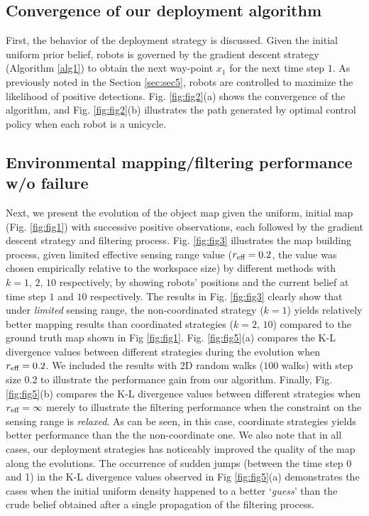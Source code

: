 \documentclass[letterpaper, 10 pt, conference]{ieeeconf}
\begin{document}
\subsection{Convergence of our deployment algorithm}
First, the behavior of the deployment strategy is discussed. Given the initial uniform prior belief, robots is governed by the gradient descent strategy (Algorithm \ref{alg1}) to obtain the next way-point $x_1$ for the next time step $1$. As previously noted in the Section \ref{sec:sec5}, robots are controlled to maximize the likelihood of positive detections.
Fig. \ref{fig:fig2}(a) shows the convergence of the algorithm, and Fig. \ref{fig:fig2}(b) illustrates the path generated by optimal control policy when each robot is a unicycle. 

\subsection{Environmental mapping/filtering performance w/o failure}
Next, we present the evolution of the object map given the uniform, initial map (Fig. \ref{fig:fig1}) with successive positive observations, each followed by the gradient descent strategy and filtering process. Fig. \ref{fig:fig3} illustrates the map building process, given limited effective sensing range value ($r_{\textup{eff}}=0.2$, the value was chosen empirically relative to the workspace size) 
by different methods with $k=1,\,2,\,10$ respectively, by showing robots' positions and the current belief at time step $1$ and $10$ respectively.
The results in Fig. \ref{fig:fig3} clearly show that under \emph{limited} sensing range, the non-coordinated strategy ($k=1$) yields relatively better mapping results than coordinated strategies ($k=2,\,10$) compared to the ground truth map shown in Fig \ref{fig:fig1}.
Fig. \ref{fig:fig5}(a) compares the K-L divergence values 
between different strategies during the evolution when $r_{\textup{eff}} =0.2$. We included the results with 2D random walks ($100$ walks) with step size $0.2$ to illustrate the performance gain from our algorithm.
Finally, Fig. \ref{fig:fig5}(b) compares the K-L divergence values between different strategies when $r_{\textup{eff}}=\infty$ merely to illustrate the filtering performance when the constraint on the sensing range is \emph{relaxed}. As can be seen, in this case, coordinate strategies yields better performance than the the non-coordinate one.
We also note that in all cases, our deployment strategies has noticeably improved the quality of the map along the evolutions.
The occurrence of sudden jumps (between the time step 0 and 1) in the K-L divergence values observed in Fig \ref{fig:fig5}(a) demonstrates the cases when the initial uniform density happened to a better `\emph{guess}' than the crude belief obtained after a single propagation of the filtering process.
\end{document}
